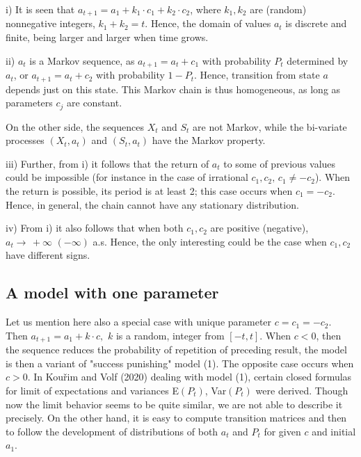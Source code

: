 \documentclass[11pt]{article}
\begin{document}
 \begin{description}
\item i) It is seen that $a_{t+1}=a_1+k_1\cdot c_1 + k_2\cdot
c_2$, where $k_1, k_2$ are (random) nonnegative integers,
$k_1+k_2=t$. Hence, the domain of values $a_t$ is discrete and
finite, being larger and larger when time grows.

\item ii) $a_t$ is a Markov sequence, as $a_{t+1}=a_t+c_1$ with
probability $P_t$ determined by $a_t$, or $a_{t+1}=a_t+c_2$ with
probability $1-P_t$. Hence, transition from state $a$ depends
just on this state. This Markov chain is thus homogeneous, as long
as parameters $c_j$ are constant.

On the other side, the sequences $X_t$ and $S_t$ are not Markov, while the
bi-variate processes $(X_t, a_t)$ and $(S_t, a_t)$ have the Markov property.

\item iii) Further, from i) it follows that the return of $a_t$ to
some of previous values could be impossible (for instance in the
case of irrational $c_1, c_2,\, c_1\ne -c_2$). When the return is
possible, its period is at least 2; this case occurs when
$c_1=-c_2$. Hence, in general, the chain cannot have any
stationary distribution.

\item iv) From i) it also follows that when both $c_1, c_2$ are
positive (negative), $a_t \to \, +\infty\,\,(-\infty)$ a.s.
Hence, the only interesting could be the case when $c_1, c_2$ have
different signs.
 \end{description}

\subsection{A model with one parameter}

Let us mention here also a special case with unique parameter
$c=c_1=-c_2$. Then $a_{t+1}=a_1+k\cdot c,$ $k$ is a random, integer from
$[-t, t]$. When $c<0$, then the sequence reduces the probability
of repetition of preceding result, the model is then a variant of
"success punishing" model (1). The opposite case occurs when
$c>0$. In Kou\v{r}im and Volf (2020) dealing with model (1),
certain closed formulas for limit of expectations and variances
E$(P_t)$, Var$(P_t)$ were derived. Though now the limit behavior
seems to be quite similar, we are not able to describe it
precisely. On the other hand, it is easy to compute transition matrices
and then to follow the development of distributions of both $a_t$ and $P_t$
 for given $c$ and initial $a_1$.
\end{document}
